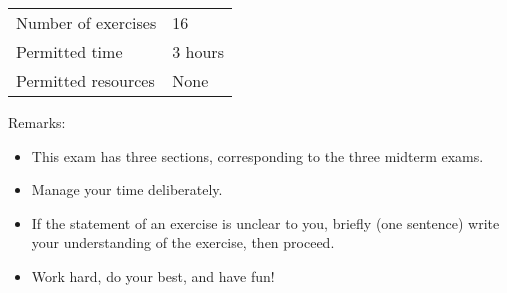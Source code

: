\begin{center}
\begin{tabular}{l@{ : }l}
Number of exercises	&	16		\\
Permitted time		&	3 hours	\\
Permitted resources	&	None
\end{tabular}
\end{center}
\vspace{.25in}
\noindent{}Remarks:
\begin{itemize}
\item This exam has three sections, corresponding to the three midterm exams.
\item Manage your time deliberately.
\item If the statement of an exercise is unclear to you, briefly (one sentence) write your understanding of the exercise, then proceed.
\item Work hard, do your best, and have fun!
\end{itemize}